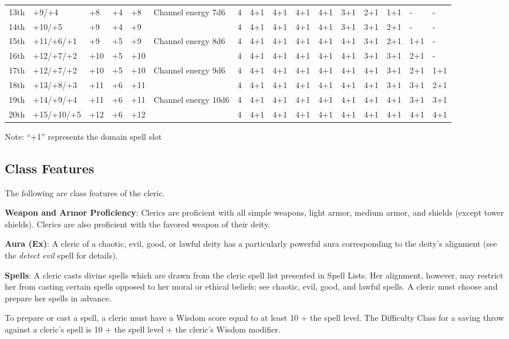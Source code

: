 \begin{table}[]
\begin{tabularx}{\linewidth}{lp{6em}p{2.5em}p{2.5em}p{2.5em}Xllllllllll}
13th & +9/+4 & +8 & +4 & +8 & Channel energy 7d6 & 4 & 4+1 & 4+1 & 4+1 & 4+1 & 3+1 & 2+1 & 1+1 & - & -\\
14th & +10/+5 & +9 & +4 & +9 &  & 4 & 4+1 & 4+1 & 4+1 & 4+1 & 3+1 & 3+1 & 2+1 & - & -\\
15th & +11/+6/+1 & +9 & +5 & +9 & Channel energy 8d6 & 4 & 4+1 & 4+1 & 4+1 & 4+1 & 4+1 & 3+1 & 2+1 & 1+1 & -\\
16th & +12/+7/+2 & +10 & +5 & +10 &  & 4 & 4+1 & 4+1 & 4+1 & 4+1 & 4+1 & 3+1 & 3+1 & 2+1 & -\\
17th & +12/+7/+2 & +10 & +5 & +10 & Channel energy 9d6 & 4 & 4+1 & 4+1 & 4+1 & 4+1 & 4+1 & 4+1 & 3+1 & 2+1 & 1+1\\
18th & +13/+8/+3 & +11 & +6 & +11 &  & 4 & 4+1 & 4+1 & 4+1 & 4+1 & 4+1 & 4+1 & 3+1 & 3+1 & 2+1\\
19th & +14/+9/+4 & +11 & +6 & +11 & Channel energy 10d6 & 4 & 4+1 & 4+1 & 4+1 & 4+1 & 4+1 & 4+1 & 4+1 & 3+1 & 3+1\\
20th & +15/+10/+5 & +12 & +6 & +12 &  & 4 & 4+1 & 4+1 & 4+1 & 4+1 & 4+1 & 4+1 & 4+1 & 4+1 & 4+1\\
\end{tabularx}
 Note: ``+1'' represents the domain spell slot\\
\end{table}

				
\subsection{Class Features}

				
The following are class features of the cleric.
				
\textbf{Weapon and Armor Proficiency}: Clerics are proficient with all simple weapons, light armor, medium armor, and shields (except tower shields). Clerics are also proficient with the favored weapon of their deity.
				
\textbf{Aura (Ex)}: A cleric of a chaotic, evil, good, or lawful deity has a particularly powerful aura corresponding to the deity's alignment (see the \textit{detect evil} spell for details).
				
\textbf{Spells}: A cleric casts divine spells which are drawn from the cleric spell list presented in Spell Lists. Her alignment, however, may restrict her from casting certain spells opposed to her moral or ethical beliefs; see chaotic, evil, good, and lawful spells. A cleric must choose and prepare her spells in advance.
				
To prepare or cast a spell, a cleric must have a Wisdom score equal to at least 10 + the spell level. The Difficulty Class for a saving throw against a cleric's spell is 10 + the spell level + the cleric's Wisdom modifier.
				
